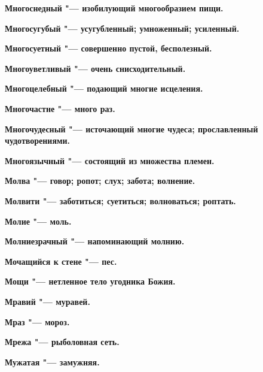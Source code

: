 \begin{mymulticols}{2}
\bfseries Многоснедный\normalfont{} "--- изобилующий многообразием пищи. 




\bfseries Многосугубый\normalfont{} "--- усугубленный; умноженный; усиленный. 




\bfseries Многосуетный\normalfont{} "--- совершенно пустой, бесполезный. 




\bfseries Многоуветливый\normalfont{} "--- очень снисходительный. 




\bfseries Многоцелебный\normalfont{} "--- подающий многие исцеления. 




\bfseries Многочастне\normalfont{} "--- много раз. 




\bfseries Многочудесный\normalfont{} "--- источающий многие чудеса; прославленный чудотворениями. 




\bfseries Многоязычный\normalfont{} "--- состоящий из множества племен. 




\bfseries Молва\normalfont{} "--- говор; ропот; слух; забота; волнение. 




\bfseries Молвити\normalfont{} "--- заботиться; суетиться; волноваться; роптать. 




\bfseries Молие\normalfont{} "--- моль. 




\bfseries Молниезрачный\normalfont{} "--- напоминающий молнию. 




\bfseries Мочащийся к стене\normalfont{} "--- пес. 




\bfseries Мощи\normalfont{} "--- нетленное тело угодника Божия. 




\bfseries Мравий\normalfont{} "--- муравей. 




\bfseries Мраз\normalfont{} "--- мороз. 




\bfseries Мрежа\normalfont{} "--- рыболовная сеть. 




\bfseries Мужатая\normalfont{} "--- замужняя. 





\end{mymulticols}
